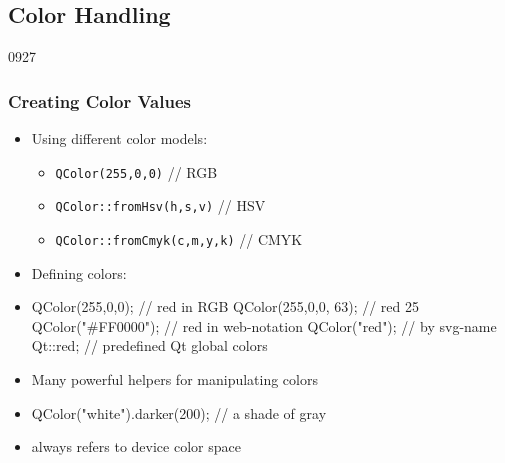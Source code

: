 %
%
%
%

\subsection{Color Handling}


\begin{slide}[fragile]{0927}\frametitle{Creating Color Values}
\begin{itemize}
  \item Using different color models:
  \begin{itemize}
    \item \texttt{QColor(255,0,0)} // RGB
    \item \texttt{QColor::fromHsv(h,s,v)} // HSV
    \item \texttt{QColor::fromCmyk(c,m,y,k)} // CMYK
  \end{itemize}
  \item Defining colors:
  \item[] \begin{cpp}
QColor(255,0,0); // red in RGB
QColor(255,0,0, 63); // red 25%
QColor("#FF0000"); // red in web-notation
QColor("red"); // by svg-name
Qt::red; // predefined Qt global colors
    \end{cpp}
  \item Many powerful helpers for manipulating colors
  \item[] \begin{cpp}
QColor("white").darker(200); // a shade of gray
    \end{cpp}
  \item {} always refers to device color space
\end{itemize}
\end{slide}

